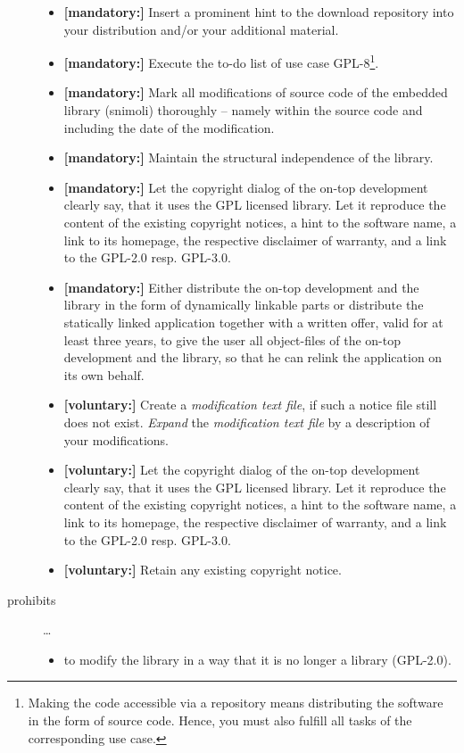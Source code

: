 \begin{description}
\begin{itemize}
  \item \textbf{[mandatory:]} Insert a prominent hint to the download repository
  into your distribution and/or your additional material.
    
  \item \textbf{[mandatory:]} Execute the to-do list of use case GPL-8\footnote{
  Making the code accessible via a repository means distributing the software in
  the form of source code. Hence, you must also fulfill all tasks of the
  corresponding use case.}.

  \item \textbf{[mandatory:]} Mark all modifications of source code of the
  embedded library (snimoli) thoroughly -- namely within the source code and
  including the date of the modification.

  \item \textbf{[mandatory:]}  Maintain the structural independence of the
  library.
    
  \item \textbf{[mandatory:]} Let the copyright dialog of the on-top development
  clearly say, that it uses the GPL licensed library. Let it reproduce the
  content of the existing copyright notices, a hint to the software name, a link
  to its homepage, the respective disclaimer of warranty, and a link to the
  GPL-2.0 resp. GPL-3.0.
  
  \item \textbf{[mandatory:]} Either distribute the on-top development and the
  library in the form of dynamically linkable parts or distribute the statically
  linked application together with a written offer, valid for at least three
  years, to give the user all object-files of the on-top development and the
  library, so that he can relink the application on its own behalf.
     
  \item \textbf{[voluntary:]} Create a \emph{modification text file}, if such a
  notice file still does not exist. \emph{Expand} the \emph{modification text
  file} by a description of your modifications.
    
  
  \item \textbf{[voluntary:]} Let the copyright dialog of the on-top development
  clearly say, that it uses the GPL licensed library. Let it reproduce the
  content of the existing copyright notices, a hint to the software name, a link
  to its homepage, the respective disclaimer of warranty, and a link to the
  GPL-2.0 resp. GPL-3.0.    
  

  \item \textbf{[voluntary:]} Retain any existing copyright notice. 
  
\end{itemize}

\item[prohibits] \ldots
\begin{itemize}
  \item to modify the library in a way that it is no longer a library
  (GPL-2.0).
\end{itemize}

\end{description}

